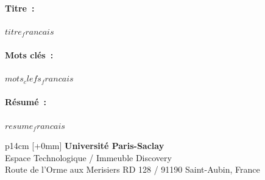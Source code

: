 \documentclass[12pt,a4paper]{reedthesis}
\begin{document}
\begin{mdframed}[linecolor=Prune,linewidth=1]
\vspace{-.25cm}
\paragraph*{Titre~:} $titre_francais$
\begin{small}
\paragraph*{Mots clés~:} $mots_clefs_francais$

\paragraph*{Résumé~:} $resume_francais$
\end{small}
\end{mdframed}

% 
% 


\vfill
{}\selectfont
\noindent\begin{tabular}{p{14cm}}
[+0mm]{\small {\color{Prune} {\bf Université Paris-Saclay}\\
{\scriptsize Espace Technologique / Immeuble Discovery}\\
{\scriptsize  Route de l’Orme aux Merisiers RD 128 / 91190 Saint-Aubin, France}}}\\\mbox{}
\end{tabular}


\end{document}

